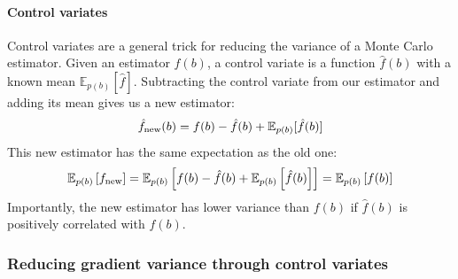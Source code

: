 \documentclass{article}
\newcommand{\controlf}{\hat f}  %
\begin{document}
\paragraph{Control variates}
Control variates are a general trick for reducing the variance of a Monte Carlo estimator.
Given an estimator $f(b)$, a control variate is a function $\controlf(b)$ with a known mean $\mathbb{E}_{p(b)} \left[ \controlf \right]$.
Subtracting the control variate from our estimator and adding its mean gives us a new estimator:
%
\begin{align}
\hat f_\textnormal{new}(b) = f(b) - \controlf(b) + \mathbb{E}_{p(b)}[\controlf(b)]
\end{align}
%
This new estimator has the same expectation as the old one:
%
\begin{align}
\mathbb{E}_{p(b)}\left[ f_\textnormal{new} \right] 
= \mathbb{E}_{p(b)}\left[f(b) - \controlf(b) + \mathbb{E}_{p(b)} \left[ \controlf(b) \right] \right]
= \mathbb{E}_{p(b)}\left[ f(b) \right]
\end{align}
%
Importantly, the new estimator has lower variance than $f(b)$ if $\controlf(b)$ is positively correlated with $f(b)$.


\subsubsection{Reducing gradient variance through control variates}
\end{document}
